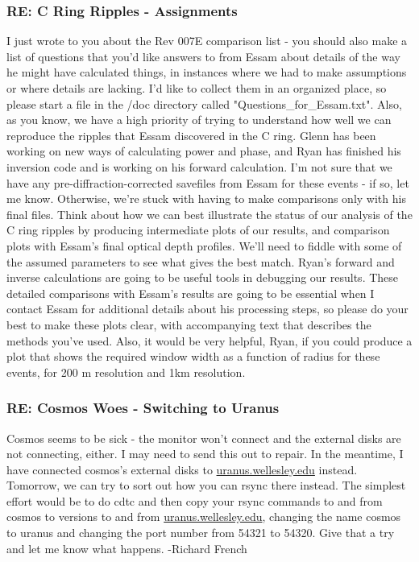 \documentclass[crop=false,class=book]{standalone}
\begin{document}
\subsubsection{\footnotesize RE: C Ring Ripples - Assignments}
I just wrote to you about the Rev 007E comparison list - you should also make a list of questions that you'd like answers to from Essam about details of the way he might have calculated things, in instances where we had to make assumptions or where details are lacking. I'd like to collect them in an organized place, so please start a file in the /doc directory called "Questions\_for\_Essam.txt". Also, as you know, we have a high priority of trying to understand how well we can reproduce the ripples that Essam discovered in the C ring. Glenn has been working on new ways of calculating power and phase, and Ryan has finished his inversion code and is working on his forward calculation. I'm not sure that we have any pre-diffraction-corrected savefiles from Essam for these events - if so, let me know. Otherwise, we're stuck with having to make comparisons only with his final files. Think about how we can best illustrate the status of our analysis of the C ring ripples by producing intermediate plots of our results, and comparison plots with Essam's final optical depth profiles. We'll need to fiddle with some of the assumed parameters to see what gives the best match. Ryan's forward and inverse calculations are going to be useful tools in debugging our results. These detailed comparisons with Essam's results are going to be essential when I contact Essam for additional details about his processing steps, so please do your best to make these plots clear, with accompanying text that describes the methods you've used. Also, it would be very helpful, Ryan, if you could produce a plot that shows the required window width as a function of radius for these events, for 200 m resolution and 1km resolution.
\subsubsection{\footnotesize RE: Cosmos Woes - Switching to Uranus}
Cosmos seems to be sick - the monitor won't connect and the external disks are not connecting, either. I may need to send this out to repair. In the meantime, I have connected cosmos's external disks to \url{uranus.wellesley.edu} instead. Tomorrow, we can try to sort out how you can rsync there instead. The simplest effort would be to do cdtc and then copy your rsync commands to and from cosmos to versions to and from \url{uranus.wellesley.edu}, changing the name cosmos to uranus and changing the port number from 54321 to 54320. Give that a try and let me know what happens. -Richard French
\end{document}
